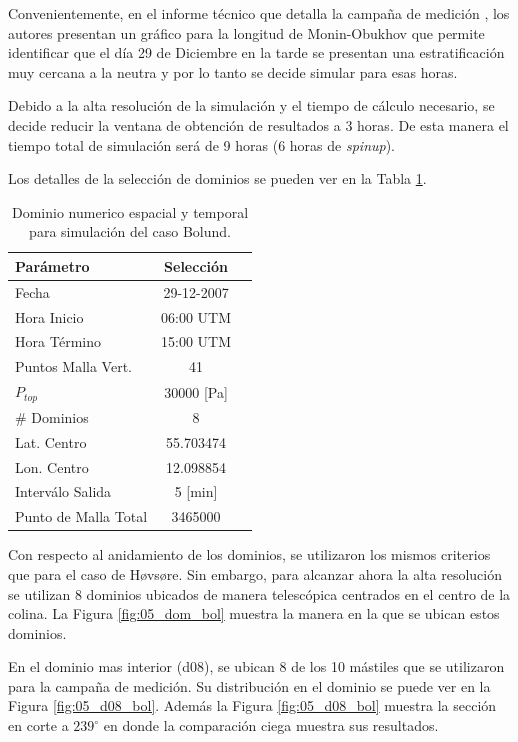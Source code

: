 Convenientemente, en el informe técnico que detalla la campaña de medición \citep{3d4285ac04444eb3b9775baf9af052c6}, los autores presentan un gráfico para la longitud de Monin-Obukhov que permite identificar que el día 29 de Diciembre en la tarde se presentan una estratificación muy cercana a la neutra y por lo tanto se decide simular para esas horas.

Debido a la alta resolución de la simulación y el tiempo de cálculo necesario, se decide reducir la ventana de obtención de resultados a 3 horas. De esta manera el tiempo total de simulación será de 9 horas (6 horas de \emph{spinup}).

Los detalles de la selección de dominios se pueden ver en la Tabla \ref{tab:05_config_bol}.

\begin{table}[h!]
	\caption{Dominio numerico espacial y temporal para simulación del caso Bolund.}\label{tab:05_config_bol}
	\centering\footnotesize
	\begin{tabular}{lcc}
		\toprule
		Parámetro & Selección \\
		\midrule
		Fecha	 	 & 29-12-2007   \\
		Hora Inicio	 	 & 06:00 UTM\\
		Hora Término	 		 & 15:00 UTM\\
		Puntos Malla Vert.	 	 & 41   \\
		$P_{top}$ 	& 30000 [Pa]\\
		\# Dominios	& 8   \\
		Lat. Centro	& 55.703474   \\
		Lon. Centro	& 12.098854   \\
		Interválo Salida & 5 [min]\\
		Punto de Malla Total & 3465000\\
		\bottomrule
	\end{tabular}
\end{table}

Con respecto al anidamiento de los dominios, se utilizaron los mismos criterios que para el caso de Høvsøre. Sin embargo, para alcanzar ahora la alta resolución se utilizan 8 dominios ubicados de manera telescópica centrados en el centro de la colina. La Figura \ref{fig:05_dom_bol} muestra la manera en la que se ubican estos dominios.

En el dominio mas interior (d08), se ubican 8 de los 10 mástiles que se utilizaron para la campaña de medición. Su distribución en el dominio se puede ver en la Figura \ref{fig:05_d08_bol}. Además la Figura \ref{fig:05_d08_bol} muestra la sección en corte a $239^\circ$ en donde la comparación ciega muestra sus resultados.


